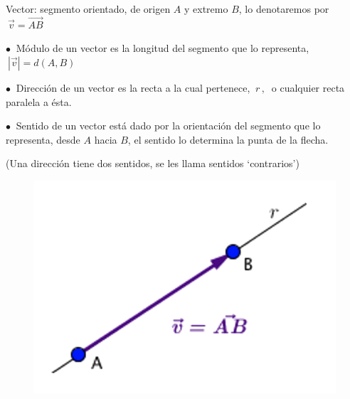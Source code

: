 	
\begin{definition}[ Vector]

Vector: segmento orientado, de origen $A$ y extremo $B$, lo denotaremos por $\ \vec v=\overrightarrow {AB}$
\begin{multicols}{2}

\vspace{2mm} $\bullet \ $ Módulo de un vector es la longitud del segmento que lo representa, $\ |\vec v|=d(A,B)$



\vspace{2mm} $\bullet \ $ Dirección de un vector es la recta a la cual pertenece, $\ r \, , \  $ o cualquier recta paralela a ésta.

\vspace{2mm} $\bullet \ $ Sentido de un vector está dado por la orientación del segmento que lo representa, desde $A$ hacia $B$, el sentido  lo determina la punta de la flecha.	\begin{small}{ (Una dirección tiene dos sentidos, se les llama sentidos `contrarios')} \end{small}


\begin{figure}[H]
	\centering
	\includegraphics[width=.5\textwidth]{img-vec/vec01.png}	
\end{figure}
\end{multicols}

\end{definition}

